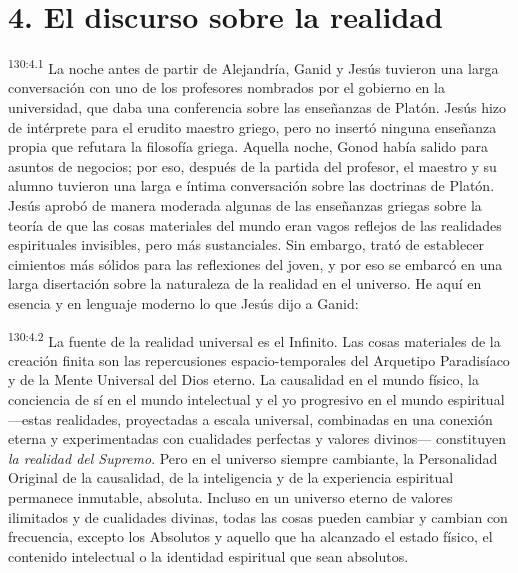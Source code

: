 \section*{4. El discurso sobre la realidad}
\par
\textsuperscript{130:4.1} La noche antes de partir de Alejandría, Ganid y Jesús tuvieron una larga conversación con uno de los profesores nombrados por el gobierno en la universidad, que daba una conferencia sobre las enseñanzas de Platón. Jesús hizo de intérprete para el erudito maestro griego, pero no insertó ninguna enseñanza propia que refutara la filosofía griega. Aquella noche, Gonod había salido para asuntos de negocios; por eso, después de la partida del profesor, el maestro y su alumno tuvieron una larga e íntima conversación sobre las doctrinas de Platón. Jesús aprobó de manera moderada algunas de las enseñanzas griegas sobre la teoría de que las cosas materiales del mundo eran vagos reflejos de las realidades espirituales invisibles, pero más sustanciales. Sin embargo, trató de establecer cimientos más sólidos para las reflexiones del joven, y por eso se embarcó en una larga disertación sobre la naturaleza de la realidad en el universo. He aquí en esencia y en lenguaje moderno lo que Jesús dijo a Ganid:

\par
\textsuperscript{130:4.2} La fuente de la realidad universal es el Infinito. Las cosas materiales de la creación finita son las repercusiones espacio-temporales del Arquetipo Paradisíaco y de la Mente Universal del Dios eterno. La causalidad en el mundo físico, la conciencia de sí en el mundo intelectual y el yo progresivo en el mundo espiritual ---estas realidades, proyectadas a escala universal, combinadas en una conexión eterna y experimentadas con cualidades perfectas y valores divinos--- constituyen \textit{la realidad del Supremo}. Pero en el universo siempre cambiante, la Personalidad Original de la causalidad, de la inteligencia y de la experiencia espiritual permanece inmutable, absoluta. Incluso en un universo eterno de valores ilimitados y de cualidades divinas, todas las cosas pueden cambiar y cambian con frecuencia, excepto los Absolutos y aquello que ha alcanzado el estado físico, el contenido intelectual o la identidad espiritual que sean absolutos.

